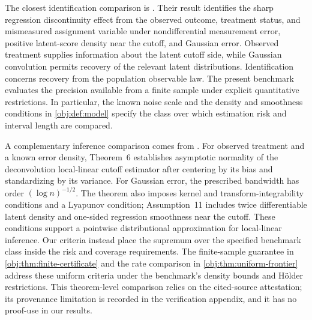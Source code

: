 \documentclass[11pt]{article}
\begin{document}
The closest identification comparison is \citet[Assumptions 1Y, 2C, and 7; Proposition 4(b)]{PeiShen2017DevilTails}. Their result identifies the sharp regression discontinuity effect from the observed outcome, treatment status, and mismeasured assignment variable under nondifferential measurement error, positive latent-score density near the cutoff, and Gaussian error. Observed treatment supplies information about the latent cutoff side, while Gaussian convolution permits recovery of the relevant latent distributions. Identification concerns recovery from the population observable law. The present benchmark evaluates the precision available from a finite sample under explicit quantitative restrictions. In particular, the known noise scale and the density and smoothness conditions in \cref{obj:def:model} specify the class over which estimation risk and interval length are compared.

A complementary inference comparison comes from \citet[Chapter~2, Assumptions~8, 9, 11, and 13; Theorem~6; printed pp.~49, 59, and 61]{Dong2018Thesis}. For observed treatment and a known error density, Theorem~6 establishes asymptotic normality of the deconvolution local-linear cutoff estimator after centering by its bias and standardizing by its variance. For Gaussian error, the prescribed bandwidth has order \((\log n)^{-1/2}\). The theorem also imposes kernel and transform-integrability conditions and a Lyapunov condition; Assumption~11 includes twice differentiable latent density and one-sided regression smoothness near the cutoff. These conditions support a pointwise distributional approximation for local-linear inference. Our criteria instead place the supremum over the specified benchmark class inside the risk and coverage requirements. The finite-sample guarantee in \cref{obj:thm:finite-certificate} and the rate comparison in \cref{obj:thm:uniform-frontier} address these uniform criteria under the benchmark's density bounds and Hölder restrictions. This theorem-level comparison relies on the cited-source attestation; its provenance limitation is recorded in the verification appendix, and it has no proof-use in our results.
\end{document}
